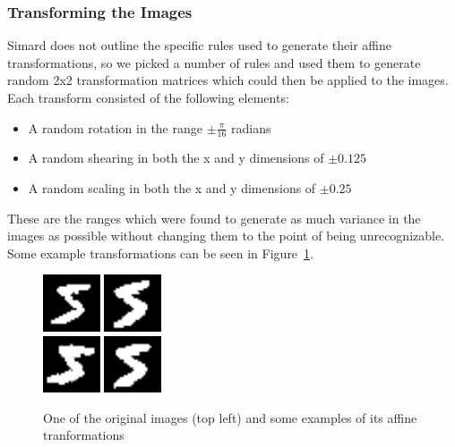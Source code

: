 \documentclass{article}
\begin{document}
\subsubsection{Transforming the Images}
Simard does not outline the specific rules used to generate their affine transformations, so we picked a number of rules and used them to generate random 2x2 transformation matrices which could then be applied to the images. Each transform consisted of the following elements:
\begin{itemize}
  \item A random rotation in the range $\pm\frac{\pi}{16}$ radians
  \item A random shearing in both the x and y dimensions of $\pm 0.125$
  \item A random scaling in both the x and y dimensions of $\pm 0.25$
\end{itemize}

These are the ranges which were found to generate as much variance in the images as possible without changing them to the point of being unrecognizable. Some example transformations can be seen in Figure~\ref{fig:transforms}.

\begin{figure}
  \centering
  \includegraphics[width=0.15\textwidth]{original.png}
  \includegraphics[width=0.15\textwidth]{transform1.png}\\
  \includegraphics[width=0.15\textwidth]{transform2.png}
  \includegraphics[width=0.15\textwidth]{transform3.png}
  \caption{One of the original images (top left) and some examples of its affine tranformations}
  \label{fig:transforms}
\end{figure}
\end{document}
